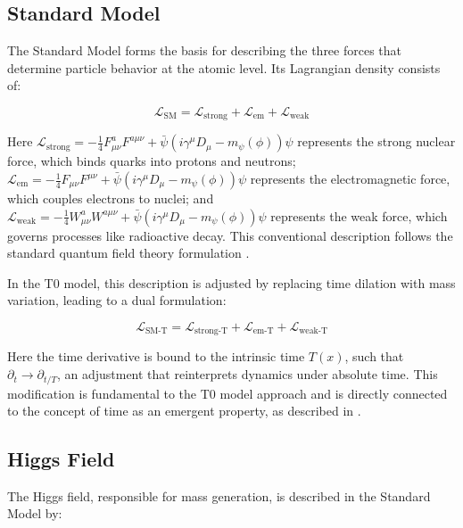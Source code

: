 \documentclass[a4paper,12pt]{article}
\newcommand{\Tfield}{T(x)}
\begin{document}
	\subsection{Standard Model}
	
	The Standard Model forms the basis for describing the three forces that determine particle behavior at the atomic level. Its Lagrangian density consists of:
	
	\begin{equation}
		\mathcal{L}_\text{SM} = \mathcal{L}_\text{strong} + \mathcal{L}_\text{em} + \mathcal{L}_\text{weak}
	\end{equation}
	
	Here $\mathcal{L}_\text{strong} = -\frac{1}{4} F_{\mu\nu}^a F^{a\mu\nu} + \bar{\psi}(i \gamma^\mu D_\mu - m_\psi(\phi))\psi$ represents the strong nuclear force, which binds quarks into protons and neutrons; $\mathcal{L}_\text{em} = -\frac{1}{4} F_{\mu\nu} F^{\mu\nu} + \bar{\psi}(i \gamma^\mu D_\mu - m_\psi(\phi))\psi$ represents the electromagnetic force, which couples electrons to nuclei; and $\mathcal{L}_\text{weak} = -\frac{1}{4} W_{\mu\nu}^a W^{a\mu\nu} + \bar{\psi}(i \gamma^\mu D_\mu - m_\psi(\phi))\psi$ represents the weak force, which governs processes like radioactive decay. This conventional description follows the standard quantum field theory formulation \cite{weinberg1995quantum}.
	
	In the T0 model, this description is adjusted by replacing time dilation with mass variation, leading to a dual formulation:
	
	\begin{equation}
		\mathcal{L}_\text{SM-T} = \mathcal{L}_\text{strong-T} + \mathcal{L}_\text{em-T} + \mathcal{L}_\text{weak-T}
	\end{equation}
	
	Here the time derivative is bound to the intrinsic time $\Tfield$, such that $\partial_t \rightarrow \partial_{t/T}$, an adjustment that reinterprets dynamics under absolute time. This modification is fundamental to the T0 model approach and is directly connected to the concept of time as an emergent property, as described in \cite{pascher_zeit_2025}.
	
	\subsection{Higgs Field}
	
	The Higgs field, responsible for mass generation, is described in the Standard Model by:
	
\end{document}
